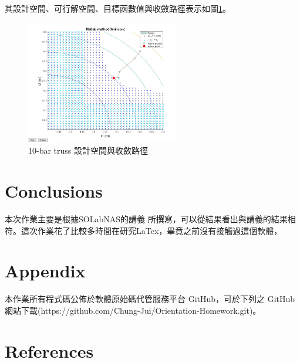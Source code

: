 \documentclass[12pt]{article}
\numberwithin{figure}{section}
\numberwithin{table}{section}
\numberwithin{equation}{section}
\begin{document}
\begin{CJK}{UTF8}{bkai}
其設計空間、可行解空間、目標函數值與收斂路徑表示如圖\ref{Fig.result}。\\
\begin{figure}[H] 
    \centering 
    \includegraphics[width=0.6\textwidth]{result.jpg} 
    \caption{10-bar truss 設計空間與收斂路徑} 
    \label{Fig.result} 
\end{figure}

\clearpage
\section{Conclusions}
本次作業主要是根據SOLabNAS的講義 \cite{Chen2017b}所撰寫，可以從結果看出與講義的結果相符。這次作業花了比較多時間在研究LaTex，畢竟之前沒有接觸過這個軟體，
~\\

\section{Appendix}
本作業所有程式碼公佈於軟體原始碼代管服務平台 GitHub，可於下列之 GitHub 網站下載(https://github.com/Chung-Jui/Orientation-Homework.git)。
~\\
\section{References}

\begingroup  %
    \renewcommand{\section}[2]{}
    
    
\endgroup

\end{CJK}
\end{document}
